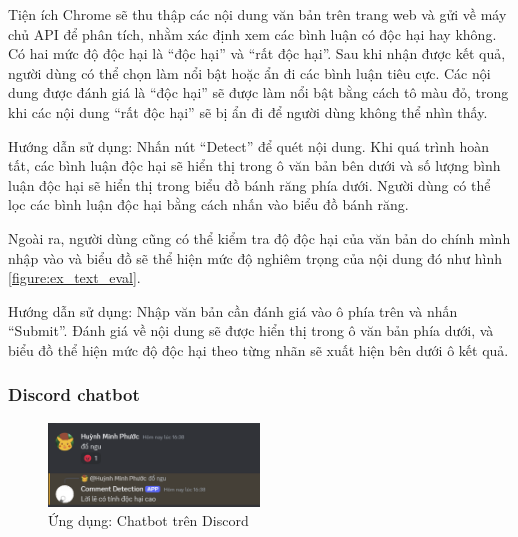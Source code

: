 


Tiện ích Chrome sẽ thu thập các nội dung văn bản trên trang web và gửi về máy chủ API để phân tích, nhằm xác định xem các bình luận có độc hại hay không. Có hai mức độ độc hại là ``độc hại'' và ``rất độc hại''. Sau khi nhận được kết quả, người dùng có thể chọn làm nổi bật hoặc ẩn đi các bình luận tiêu cực. Các nội dung được đánh giá là ``độc hại'' sẽ được làm nổi bật bằng cách tô màu đỏ, trong khi các nội dung ``rất độc hại'' sẽ bị ẩn đi để người dùng không thể nhìn thấy.

Hướng dẫn sử dụng: Nhấn nút ``Detect'' để quét nội dung. Khi quá trình hoàn tất, các bình luận độc hại sẽ hiển thị trong ô văn bản bên dưới và số lượng bình luận độc hại sẽ hiển thị trong biểu đồ bánh răng phía dưới. Người dùng có thể lọc các bình luận độc hại bằng cách nhấn vào biểu đồ bánh răng.

Ngoài ra, người dùng cũng có thể kiểm tra độ độc hại của văn bản do chính mình nhập vào và biểu đồ sẽ thể hiện mức độ nghiêm trọng của nội dung đó như hình \ref{figure:ex_text_eval}.

Hướng dẫn sử dụng: Nhập văn bản cần đánh giá vào ô phía trên và nhấn ``Submit''. Đánh giá về nội dung sẽ được hiển thị trong ô văn bản phía dưới, và biểu đồ thể hiện mức độ độc hại theo từng nhãn sẽ xuất hiện bên dưới ô kết quả.

\subsubsection{Discord chatbot}
\begin{figure}[htb]
    \centering
    \includegraphics[width=0.5\textwidth]{image/bot_discord.png}
    \caption{Ứng dụng: Chatbot trên Discord}
    \label{figure:bot_discord}
\end{figure}

